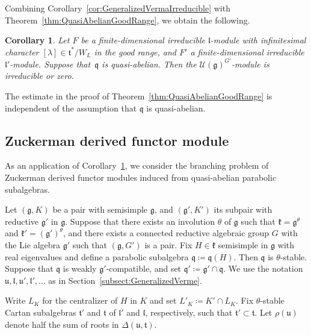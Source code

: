 \documentclass[11pt]{article}
\numberwithin{equation}{section}
\numberwithin{equation}{section}
\newtheorem{Corollary}[Theorem]{Corollary}
\theoremstyle{definition}
\newcommand{\Hom}{\mathrm{Hom}}
\newcommand{\lieC}[1]{\mathfrak{#1}}
\newcommand{\lie}[1]{\mathfrak{#1}}
\newcommand{\univ}[1]{\mathcal{U}(\lieC{#1})}
\newcommand{\ind}[2]{\mathrm{ind}^{\lieC{#1}}_{\lieC{#2}}}
\newcommand{\rhog}[1]{\rho(#1)}
\begin{document}
Combining Corollary~\ref{cor:GeneralizedVermaIrreducible} with Theorem~\ref{thm:QuasiAbelianGoodRange}, we obtain the following.

\begin{Corollary}\label{cor:IrreducibleVermaQuasiAbelian}
	Let $F$ be a finite-dimensional irreducible $\lie{l}$-module with infinitesimal character $[\lambda] \in \lie{t}^*/W_L$
	in the good range, and $F'$ a finite-dimensional irreducible $\lie{l}'$-module.
	Suppose that~$\lie{q}$ is quasi-abelian.
	Then the $\univ{g}^{G'}$-module \smash{$\Hom_{\lie{g'}}\bigl(\ind{g'}{q'}(F'), \ind{g}{q}(F)\bigr)$} is irreducible or zero.
\end{Corollary}

The estimate in the proof of Theorem~\ref{thm:QuasiAbelianGoodRange} is independent of the assumption that $\lie{q}$ is quasi-abelian.

\setcounter{subsection}{3}\setcounter{Theorem}{22}
\subsection{Zuckerman derived functor module}

As an application of Corollary~\ref{cor:IrreducibleVermaQuasiAbelian},
we consider the branching problem of Zuckerman derived functor modules induced from
quasi-abelian parabolic subalgebras.

Let $(\lie{g}, K)$ be a pair with semisimple $\lie{g}$, and $(\lie{g'}, K')$ its subpair with reductive $\lie{g'}$ in $\lie{g}$.
Suppose that there exists an involution $\theta$ of $\lie{g}$ such that $\lie{k} = \lie{g}^\theta$ and $\lie{k'} = (\lie{g'})^\theta$,
and there exists a connected reductive algebraic group $G$ with the Lie algebra $\lie{g'}$ such that $(\lie{g}, G')$ is a pair.
Fix $H \in \lie{k}$ semisimple in $\lie{g}$ with real eigenvalues
and define a parabolic subalgebra $\lie{q}\coloneq \lie{q}(H)$.
Then $\lie{q}$ is $\theta$-stable.
Suppose that $\lie{q}$ is weakly $\lie{g'}$-compatible, and set $\lie{q'}\coloneq \lie{g'}\cap \lie{q}$.
We use the notation $\lie{u}, \lie{l}, \lie{u'}, \lie{l'}, \ldots$ as in Section~\ref{subsect:GeneralizedVerme}.

Write $L_K$ for the centralizer of $H$ in $K$ and set $L'_K\coloneq K'\cap L_K$.
Fix $\theta$-stable Cartan subalgebras $\lie{t'}$ and $\lie{t}$ of $\lie{l'}$ and $\lie{l}$, respectively, such that $\lie{t'}\subset \lie{t}$.
Let $\rhog{\lie{u}}$ denote half the sum of roots in $\Delta(\lie{u}, \lie{t})$.
\end{document}
